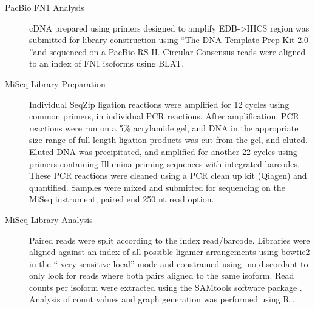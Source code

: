\begin{description}
		\item[PacBio FN1 Analysis] 
		cDNA prepared using primers designed to amplify EDB->IIICS region was submitted for library construction using ``The DNA Template Prep Kit 2.0 ''and sequenced on a PacBio RS II. Circular Consensus reads were aligned to an index of FN1 isoforms using BLAT. 

		\item[MiSeq Library Preparation] 
		Individual SeqZip ligation reactions were amplified for 12 cycles using common primers, in individual PCR reactions. After amplification, PCR reactions were run on a 5\% acrylamide gel, and DNA in the appropriate size range of full-length ligation products was cut from the gel, and eluted. Eluted DNA was precipitated, and amplified for another 22 cycles using primers containing Illumina priming sequences with integrated barcodes. These PCR reactions were cleaned using a PCR clean up kit (Qiagen) and quantified. Samples were mixed and submitted for sequencing on the MiSeq instrument, paired end 250 nt read option.

		\item[MiSeq Library Analysis] 
		Paired reads were split according to the index read/barcode. Libraries were aligned against an index of all possible \dscam{} ligamer arrangements using bowtie2 \citep{Langmead2012} in the ``-very-sensitive-local'' mode and constrained using -no-discordant to only look for reads where both pairs aligned to the same isoform. Read counts per isoform were extracted using the SAMtools software package \citep{Li2009d}. Analysis of count values and graph generation was performed using R \citep{RDevelopmentCoreTeam2011}.
		

\end{description}
